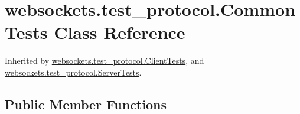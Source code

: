 \hypertarget{classwebsockets_1_1test__protocol_1_1_common_tests}{}\section{websockets.\+test\+\_\+protocol.\+Common\+Tests Class Reference}
\label{classwebsockets_1_1test__protocol_1_1_common_tests}


Inherited by \hyperlink{classwebsockets_1_1test__protocol_1_1_client_tests}{websockets.\+test\+\_\+protocol.\+Client\+Tests}, and \hyperlink{classwebsockets_1_1test__protocol_1_1_server_tests}{websockets.\+test\+\_\+protocol.\+Server\+Tests}.

\subsection*{Public Member Functions}
